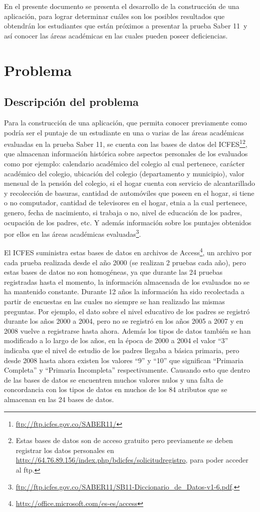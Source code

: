En el presente documento se presenta el desarrollo de la construcción de una aplicación, para lograr determinar cuáles son los posibles resultados que obtendrán los estudiantes que están próximos a presentar la prueba Saber 11\degree \ y así conocer las áreas académicas en las cuales pueden poseer deficiencias.

\section{Problema}
\subsection{Descripción del problema}
Para la construcción de una aplicación, que permita conocer previamente como podría ser el puntaje de un estudiante en una o varias de las áreas académicas evaluadas en la prueba Saber 11\degree, se cuenta con las bases de datos del ICFES\footnote{\url{ftp://ftp.icfes.gov.co/SABER11/}}\footnote{Estas bases de datos son de acceso gratuito pero previamente se deben registrar los datos personales en \url{http://64.76.89.156/index.php/bdicfes/solicitudregistro}, para poder acceder al ftp.}, que almacenan información histórica sobre aspectos personales de los evaluados como por ejemplo: calendario académico del colegio al cual pertenece, carácter académico del colegio, ubicación del colegio (departamento y municipio), valor mensual de la pensión del colegio, si el hogar cuenta con servicio de alcantarillado y recolección de basuras, cantidad de automóviles que poseen en el hogar, si tiene o no computador, cantidad de televisores en el hogar, etnia a la cual pertenece, genero, fecha de nacimiento, si trabaja o no, nivel de educación de los padres, ocupación de los padres, etc. Y además información sobre los puntajes obtenidos por ellos en las áreas académicas evaluadas\footnote{\url{ftp://ftp.icfes.gov.co/SABER11/SB11-Diccionario_de_Datos-v1-6.pdf}.}.

El ICFES suministra estas bases de datos en archivos de Access\footnote{\url{http://office.microsoft.com/es-es/access}}, un archivo por cada prueba realizada desde el año 2000 (se realizan 2 pruebas cada año), pero estas bases de datos no son homogéneas, ya que durante las 24 pruebas registradas hasta el momento, la información almacenada de los evaluados no se ha mantenido constante. Durante 12 años la información ha sido recolectada a partir de encuestas en las cuales no siempre se han realizado las mismas preguntas. Por ejemplo, el dato sobre el nivel educativo de los padres se registró durante los años 2000 a 2004, pero no se registró en los años 2005 a 2007 y en 2008 vuelve a registrarse hasta ahora. Además los tipos de datos también se han modificado a lo largo de los años, en la época de 2000 a 2004 el valor ``3'' indicaba que el nivel de estudio de los padres llegaba a básica primaria, pero desde 2008 hasta ahora existen los valores ``9'' y ``10'' que significan ``Primaria Completa'' y ``Primaria Incompleta'' respectivamente. Causando esto que dentro de las bases de datos se encuentren muchos valores nulos y una falta de concordancia con los tipos de datos en muchos de los 84 atributos que se almacenan en las 24 bases de datos.

